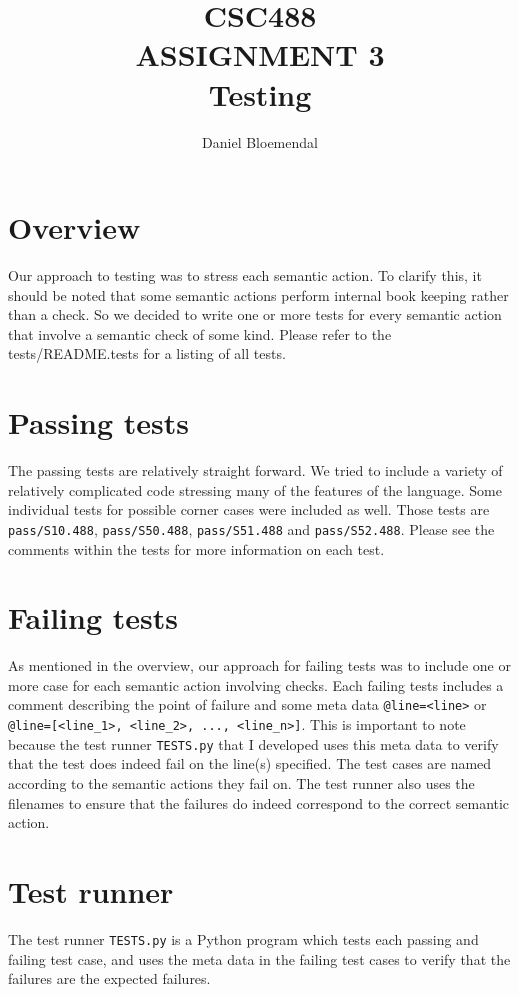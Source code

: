 \documentclass[oneside]{amsart}
\theoremstyle{definition}
\theoremstyle{remark}
\numberwithin{equation}{section}
\begin{document}
\title[CSC488 A3]{CSC488\\ASSIGNMENT 3\\Testing}
\author{Daniel Bloemendal}

\begin{titlepage}
\maketitle
\thispagestyle{empty}
\tableofcontents
\end{titlepage}

\section{Overview}
Our approach to testing was to stress each semantic action. To clarify this, it
should be noted that some semantic actions perform internal book keeping rather
than a check. So we decided to write one or more tests for every semantic action
that involve a semantic check of some kind. Please refer to the
tests/README.tests for a listing of all tests.

\section{Passing tests}
The passing tests are relatively straight forward. We tried to include a variety 
of relatively complicated code stressing many of the features of the language.
Some individual tests for possible corner cases were included as well.
Those tests are \texttt{pass/S10.488}, \texttt{pass/S50.488},
\texttt{pass/S51.488} and \texttt{pass/S52.488}. Please see the comments within
the tests for more information on each test.

\section{Failing tests}
As mentioned in the overview, our approach for failing tests was to include one
or more case for each semantic action involving checks. Each failing tests
includes a comment describing the point of failure and some meta data
\texttt{@line=<line>} or \texttt{@line=[<line\_1>, <line\_2>, ..., <line\_n>]}.
This is important to note because the test runner \texttt{TESTS.py} that I
developed uses this meta data to verify that the test does indeed fail on the
line(s) specified. The test cases are named according to the semantic actions
they fail on. The test runner also uses the filenames to ensure that the
failures do indeed correspond to the correct semantic action.

\section{Test runner}
The test runner \texttt{TESTS.py} is a Python program which tests each passing
and failing test case, and uses the meta data in the failing test cases to
verify that the failures are the expected failures.

\end{document}
